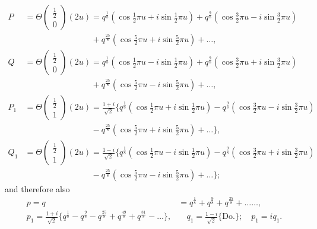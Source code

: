 \documentclass[12pt,a4paper]{article}
\theoremstyle{definition}
\begin{document}
\begin{align*}
P &= \Theta\begin{pmatrix} \tfrac{1}{2} \\ 0 \end{pmatrix}(2u) = q^{\frac{1}{8}}(\cos\tfrac{1}{2}\pi u + i\sin\tfrac{1}{2}\pi u) + q^{\frac{9}{8}}(\cos\tfrac{3}{2}\pi u - i\sin\tfrac{3}{2}\pi u) \\
  &\qquad\qquad\qquad\qquad + q^{\frac{25}{8}}(\cos\tfrac{5}{2}\pi u + i\sin\tfrac{5}{2}\pi u) + \dots, \\
Q &= \Theta\begin{pmatrix} \tfrac{1}{2} \\ 0 \end{pmatrix}(2u) = q^{\frac{1}{8}}(\cos\tfrac{1}{2}\pi u - i\sin\tfrac{1}{2}\pi u) + q^{\frac{9}{8}}(\cos\tfrac{3}{2}\pi u + i\sin\tfrac{3}{2}\pi u) \\
  &\qquad\qquad\qquad\qquad + q^{\frac{25}{8}}(\cos\tfrac{5}{2}\pi u - i\sin\tfrac{5}{2}\pi u) + \dots, \\[0.5em]
P_1 &= \Theta\begin{pmatrix} \tfrac{1}{2} \\ 1 \end{pmatrix}(2u) = \frac{1 + i}{\sqrt{2}}\{q^{\frac{1}{8}}(\cos\tfrac{1}{2}\pi u + i\sin\tfrac{1}{2}\pi u) - q^{\frac{9}{8}}(\cos\tfrac{3}{2}\pi u - i\sin\tfrac{3}{2}\pi u) \\
  &\qquad\qquad\qquad\qquad - q^{\frac{25}{8}}(\cos\tfrac{5}{2}\pi u + i\sin\tfrac{5}{2}\pi u) + \dots\}, \\[0.5em]
Q_1 &= \Theta\begin{pmatrix} \tfrac{1}{2} \\ 1 \end{pmatrix}(2u) = \frac{1 - i}{\sqrt{2}}\{q^{\frac{1}{8}}(\cos\tfrac{1}{2}\pi u - i\sin\tfrac{1}{2}\pi u) - q^{\frac{9}{8}}(\cos\tfrac{3}{2}\pi u + i\sin\tfrac{3}{2}\pi u) \\
  &\qquad\qquad\qquad\qquad - q^{\frac{25}{8}}(\cos\tfrac{5}{2}\pi u - i\sin\tfrac{5}{2}\pi u) + \dots\};
\end{align*}
and therefore also
\begin{align*}
p = q &= q^{\frac{1}{8}} + q^{\frac{9}{8}} + q^{\frac{25}{8}} + \dots\dots, \\
p_1 = \frac{1 + i}{\sqrt{2}}\{q^{\frac{1}{8}} - q^{\frac{9}{8}} - q^{\frac{25}{8}} + q^{\frac{49}{8}} + q^{\frac{81}{8}} - \dots\}, &\quad
q_1 = \frac{1 - i}{\sqrt{2}}\{\text{Do.}\};\quad p_1 = iq_1.
\end{align*}
\end{document}
